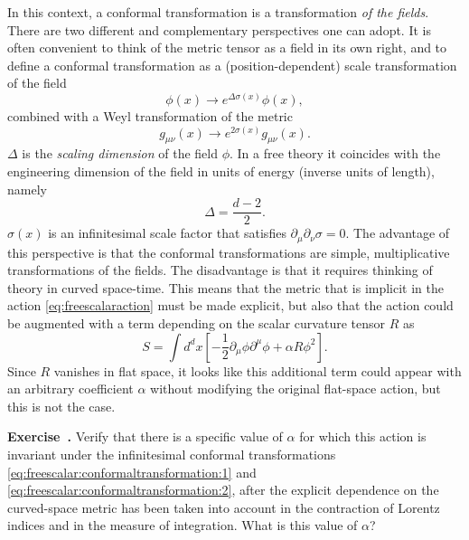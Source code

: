 \documentclass[a4paper,12pt]{article}
\numberwithin{equation}{section}
\newcounter{exercise}[section]
\newenvironment{exercise}[1][]%
	{\refstepcounter{exercise}\bigskip
	\begin{mdframed}[backgroundcolor=gray!20, linewidth=0]
	\noindent\textbf{Exercise~\thesection.\theexercise #1} \rmfamily}
  	{\end{mdframed}\bigskip}
\begin{document}
In this context, a conformal transformation is a transformation \emph{of the fields}.
There are two different and complementary perspectives one can adopt. It is often convenient to think of the metric tensor as a field in its own right, and to define a conformal transformation as a (position-dependent) scale transformation of the field
\begin{equation}
	\phi(x) \to e^{\Delta \sigma(x)} \phi(x),
	\label{eq:freescalar:conformaltransformation:1}
\end{equation}
combined with a Weyl transformation of the metric
\begin{equation}
	g_{\mu\nu}(x) \to e^{2 \sigma(x)} g_{\mu\nu}(x).
	\label{eq:freescalar:conformaltransformation:2}
\end{equation}
$\Delta$ is the \emph{scaling dimension} of the field $\phi$. In a free theory it coincides with the engineering dimension of the field in units of energy (inverse units of length), namely
\begin{equation}
	\Delta = \frac{d-2}{2}.
\end{equation}
$\sigma(x)$ is an infinitesimal scale factor that satisfies $\partial_\mu \partial_\nu \sigma = 0$.
The advantage of this perspective is that the conformal transformations are simple, multiplicative transformations of the fields. The disadvantage is that it requires thinking of theory in curved space-time. This means that the metric that is implicit in the action \eqref{eq:freescalaraction} must be made explicit, but also that the action could be augmented with a term depending on the scalar curvature tensor $R$ as
\begin{equation}
	S = \int d^dx
	\left[ - \frac{1}{2} \partial_\mu \phi \partial^\mu \phi
	+ \alpha R \phi^2 \right].
\end{equation}
Since $R$ vanishes in flat space, it looks like this additional term could appear with an arbitrary coefficient $\alpha$ without modifying the original flat-space action, but this is not the case.
%
\begin{exercise}
	Verify that there is a specific value of $\alpha$ 
	for which this action is invariant
	under the infinitesimal conformal transformations
	\eqref{eq:freescalar:conformaltransformation:1} and
	\eqref{eq:freescalar:conformaltransformation:2},
	after the explicit dependence on the curved-space metric 
	has been taken into account in the contraction of Lorentz
	indices and in the measure of integration.
	What is this value of $\alpha$?
\end{exercise}
\end{document}
